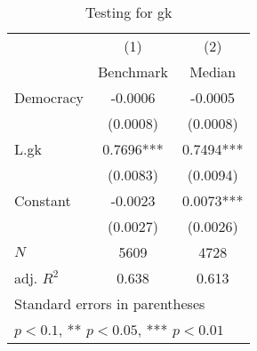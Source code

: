 \begin{table}[htbp]\centering
\def\sym#1{\ifmmode^{#1}\else\(^{#1}\)\fi}
\caption{Testing for gk \label{tab:regression5}}
\begin{tabular}{l*{2}{c}}
\hline\hline
            &\multicolumn{1}{c}{(1)}&\multicolumn{1}{c}{(2)}\\
            &\multicolumn{1}{c}{Benchmark}&\multicolumn{1}{c}{Median}\\
\hline
Democracy   &     -0.0006   &     -0.0005   \\
            &    (0.0008)   &    (0.0008)   \\
[1em]
L.gk        &      0.7696***&      0.7494***\\
            &    (0.0083)   &    (0.0094)   \\
[1em]
Constant    &     -0.0023   &      0.0073***\\
            &    (0.0027)   &    (0.0026)   \\
\hline
\(N\)       &        5609   &        4728   \\
adj. \(R^{2}\)&       0.638   &       0.613   \\
\hline\hline
\multicolumn{3}{l}{\footnotesize Standard errors in parentheses}\\
\multicolumn{3}{l}{\footnotesize * \(p<0.1\), ** \(p<0.05\), *** \(p<0.01\)}\\
\end{tabular}
\end{table}
